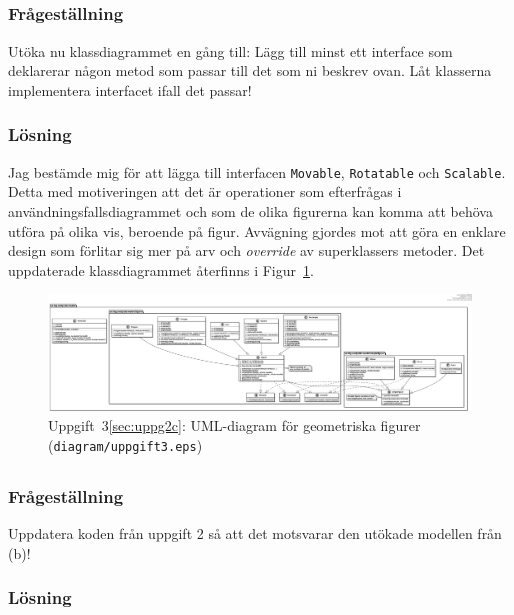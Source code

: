 \subsection{}\label{sec:uppg3b}
\subsubsection*{Frågeställning}
Utöka nu klassdiagrammet en gång till: Lägg till minst ett interface som
deklarerar någon metod som passar till det som ni beskrev ovan. Låt klasserna
implementera interfacet ifall det passar!

\subsubsection*{Lösning}
Jag bestämde mig för att lägga till interfacen \texttt{Movable},
\texttt{Rotatable} och \texttt{Scalable}. Detta med motiveringen att det
är operationer som efterfrågas i användningsfallsdiagrammet och som de olika
figurerna kan komma att behöva utföra på olika vis, beroende på figur. 
Avvägning gjordes mot att göra en enklare design som förlitar sig mer på arv
och \emph{override} av superklassers metoder. Det uppdaterade klassdiagrammet
återfinns i Figur~\ref{fig:uppg3b}.

\begin{figure}
\centering
\includegraphics[width=\linewidth]{diagram/uppgift3.eps}
\caption{Uppgift~3\ref{sec:uppg2c}: UML-diagram för geometriska figurer
(\texttt{diagram/uppgift3.eps})}
\label{fig:uppg3b}
\end{figure}



\subsection{}\label{sec:uppg3c}
\subsubsection*{Frågeställning}
Uppdatera koden från uppgift 2 så att det motsvarar den utökade modellen från
(b)!

\subsubsection*{Lösning}


